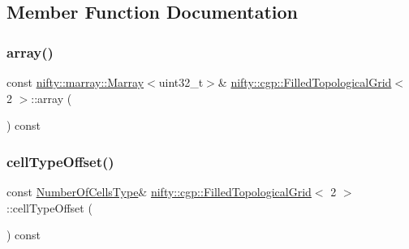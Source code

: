\subsection{Member Function Documentation}
\mbox{\label{classnifty_1_1cgp_1_1FilledTopologicalGrid_3_012_01_4_a94cbda5048125dbece8c611b3adad5b2}} 
\subsubsection{\texorpdfstring{array()}{array()}}
{\footnotesize\ttfamily const \hyperlink{classandres_1_1Marray}{nifty\+::marray\+::\+Marray}$<$uint32\+\_\+t$>$\& \hyperlink{classnifty_1_1cgp_1_1FilledTopologicalGrid}{nifty\+::cgp\+::\+Filled\+Topological\+Grid}$<$ 2 $>$\+::array (\begin{DoxyParamCaption}{ }\end{DoxyParamCaption}) const\hspace{0.3cm}{\ttfamily [inline]}}

\mbox{\label{classnifty_1_1cgp_1_1FilledTopologicalGrid_3_012_01_4_af7902f54d76c04a378bc51afc051accb}} 
\subsubsection{\texorpdfstring{cell\+Type\+Offset()}{cellTypeOffset()}}
{\footnotesize\ttfamily const \hyperlink{classnifty_1_1cgp_1_1FilledTopologicalGrid_3_012_01_4_a4026316cb9c7a8e6958cb32e6324ea7d}{Number\+Of\+Cells\+Type}\& \hyperlink{classnifty_1_1cgp_1_1FilledTopologicalGrid}{nifty\+::cgp\+::\+Filled\+Topological\+Grid}$<$ 2 $>$\+::cell\+Type\+Offset (\begin{DoxyParamCaption}{ }\end{DoxyParamCaption}) const\hspace{0.3cm}{\ttfamily [inline]}}

